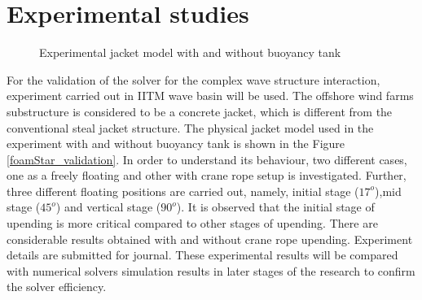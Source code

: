 \documentclass[preprint,12pt]{article}
\begin{document}
{\section{Experimental studies}
	\begin{figure}[H]
	\centering     %
	\caption{Experimental jacket model with and without buoyancy tank}
\end{figure}

For the validation of the solver for the complex wave structure interaction, experiment carried out in IITM wave basin will be used. The offshore wind farms substructure is considered to be a concrete jacket, which is different from the conventional steal jacket structure. The physical jacket model used in the experiment with and without buoyancy tank is shown in the Figure \ref{foamStar_validation}. In order to understand its behaviour, two different cases, one as a freely floating and other with crane rope setup is investigated. Further, three different floating positions are carried out, namely, initial stage ($17^o$),mid stage ($45^o$) and vertical stage ($90^o$).  It is observed that the initial stage of upending is more critical compared to other stages of upending. There are considerable results obtained with and without crane rope upending. Experiment details are submitted for journal.  These experimental results will be compared with numerical solvers simulation results in later stages of the research to confirm the solver efficiency. 



}
\end{document}

